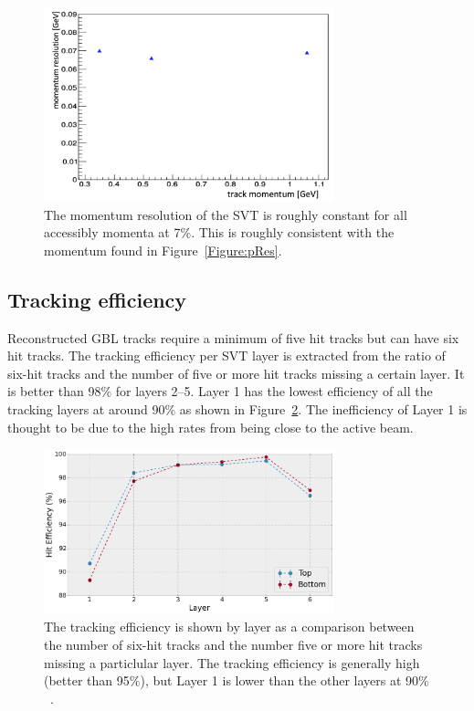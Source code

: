\begin{figure}[thb]
  \centering
      \includegraphics[width=0.75\textwidth]{pics/performance/pResExtrapolated.png}
  \caption[Momentum resolution of the SVT extracted from $E/P$]{The momentum resolution of the SVT is roughly constant for all accessibly momenta at 7$\%$. This is roughly consistent with the momentum found in Figure~\ref{Figure:pRes}.}
  \label{Figure:pResExtrap}
\end{figure}

\subsection{Tracking efficiency}

Reconstructed GBL tracks require a minimum of five hit tracks but can have six hit tracks. The tracking efficiency per SVT layer is extracted from the ratio of six-hit tracks and the number of five or more hit tracks missing a certain layer. It is better than 98$\%$ for layers 2--5. Layer 1 has the lowest efficiency of all the tracking layers at around 90$\%$ as shown in Figure~\ref{Figure:trackEff}. The inefficiency of Layer 1 is thought to be due to the high rates from being close to the active beam. 

\begin{figure}[thb]
  \centering
      \includegraphics[width=0.75\textwidth]{pics/performance/engrun2015_hit_efficiency_vs_layer.png}
  \caption[Tracking efficiency of the SVT by layer]{The tracking efficiency is shown by layer as a comparison between the number of six-hit tracks and the number five or more hit tracks missing a particlular layer. The tracking efficiency is generally high (better than 95$\%$), but Layer 1 is lower than the other layers at  90$\%$~\cite{moreno_search_2016}.}
  \label{Figure:trackEff}
\end{figure}

